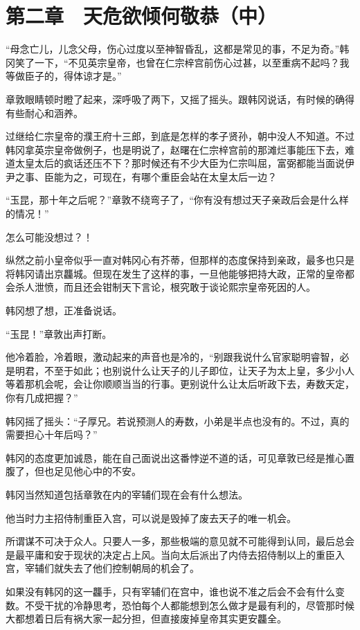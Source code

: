 \section{第二章　天危欲倾何敬恭（中）}

“母念亡儿，儿念父母，伤心过度以至神智昏乱，这都是常见的事，不足为奇。”韩冈笑了一下，“不见英宗皇帝，也曾在仁宗梓宫前伤心过甚，以至重病不起吗？我等做臣子的，得体谅才是。”

章敦眼睛顿时瞪了起来，深呼吸了两下，又摇了摇头。跟韩冈说话，有时候的确得有些耐心和涵养。

过继给仁宗皇帝的濮王府十三郎，到底是怎样的孝子贤孙，朝中没人不知道。不过韩冈拿英宗皇帝做例子，也是明说了，赵曙在仁宗梓宫前的那滩烂事能压下去，难道太皇太后的疯话还压不下？那时候还有不少大臣为仁宗叫屈，富弼都能当面说伊尹之事、臣能为之，可现在，有哪个重臣会站在太皇太后一边？

“玉昆，那十年之后呢？”章敦不绕弯子了，“你有没有想过天子亲政后会是什么样的情况！”

怎么可能没想过？！

纵然之前小皇帝似乎一直对韩冈心有芥蒂，但那样的态度保持到亲政，最多也只是将韩冈请出京龘城。但现在发生了这样的事，一旦他能够把持大政，正常的皇帝都会杀人泄愤，而且还会钳制天下言论，根究敢于谈论熙宗皇帝死因的人。

韩冈想了想，正准备说话。

“玉昆！”章敦出声打断。

他冷着脸，冷着眼，激动起来的声音也是冷的，“别跟我说什么官家聪明睿智，必是明君，不至于如此；也别说什么让天子的儿子即位，让天子为太上皇，多少小人等着那机会呢，会让你顺顺当当的行事。更别说什么让太后听政下去，寿数天定，你有几成把握？”

韩冈摇了摇头：“子厚兄。若说预测人的寿数，小弟是半点也没有的。不过，真的需要担心十年后吗？”

韩冈的态度更加诚恳，能在自己面说出这番悖逆不道的话，可见章敦已经是推心置腹了，但也足见他心中的不安。

韩冈当然知道包括章敦在内的宰辅们现在会有什么想法。

他当时力主招侍制重臣入宫，可以说是毁掉了废去天子的唯一机会。

所谓谋不可决于众人。只要人一多，那些极端的意见就不可能得到认同，最后总会是最平庸和安于现状的决定占上风。当向太后派出了内侍去招侍制以上的重臣入宫，宰辅们就失去了他们控制朝局的机会了。

如果没有韩冈的这一龘手，只有宰辅们在宫中，谁也说不准之后会不会有什么变数。不受干扰的冷静思考，恐怕每个人都能想到怎么做才是最有利的，尽管那时候大都想着日后有祸大家一起分担，但直接废掉皇帝其实更安龘全。


